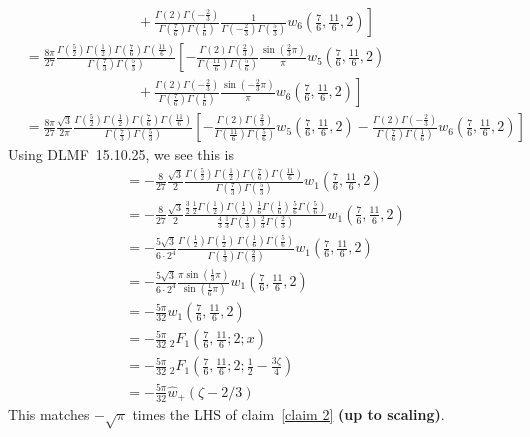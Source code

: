 \documentclass[11pt,a4paper,twoside,leqno,noamsfonts]{amsart}
\numberwithin{equation}{section}
\begin{document}
\begin{example}[Airy]
\begin{align*}
& \qquad\qquad\qquad\qquad + \left. \frac{\Gamma(2) \Gamma(-\tfrac{2}{3})}{\Gamma(\tfrac{7}{6}) \Gamma(\tfrac{1}{6})} \frac{1}{\Gamma(-\tfrac{2}{3}) \Gamma(\tfrac{5}{3})} w_6(\tfrac{7}{6}, \tfrac{11}{6}, 2) \right] \\
&=\frac{8\pi}{27} \frac{\Gamma(\tfrac{5}{2}) \Gamma(\tfrac{1}{2}) \Gamma(\tfrac{7}{6}) \Gamma(\tfrac{11}{6})}{\Gamma(\tfrac{7}{3}) \Gamma(\tfrac{5}{3})} \left[ -\frac{\Gamma(2) \Gamma(\tfrac{2}{3})}{\Gamma(\tfrac{11}{6}) \Gamma(\tfrac{5}{6})} \frac{\sin(\tfrac{2}{3} \pi)}{\pi} w_5(\tfrac{7}{6}, \tfrac{11}{6}, 2) \right. \\
& \qquad\qquad\qquad\qquad + \left. \frac{\Gamma(2) \Gamma(-\tfrac{2}{3})}{\Gamma(\tfrac{7}{6}) \Gamma(\tfrac{1}{6})} \frac{\sin(-\tfrac{2}{3} \pi)}{\pi} w_6(\tfrac{7}{6}, \tfrac{11}{6}, 2) \right] \\
&=\frac{8\pi}{27} \frac{\sqrt{3}}{2\pi} \frac{\Gamma(\tfrac{5}{2}) \Gamma(\tfrac{1}{2}) \Gamma(\tfrac{7}{6}) \Gamma(\tfrac{11}{6})}{\Gamma(\tfrac{7}{3}) \Gamma(\tfrac{5}{3})} \left[ -\frac{\Gamma(2) \Gamma(\tfrac{2}{3})}{\Gamma(\tfrac{11}{6}) \Gamma(\tfrac{5}{6})} w_5(\tfrac{7}{6}, \tfrac{11}{6}, 2) - \frac{\Gamma(2) \Gamma(-\tfrac{2}{3})}{\Gamma(\tfrac{7}{6}) \Gamma(\tfrac{1}{6})} w_6(\tfrac{7}{6}, \tfrac{11}{6}, 2) \right]
\end{align*}
Using DLMF~15.10.25, we see this is
\begin{align*}
&=-\frac{8}{27} \frac{\sqrt{3}}{2} \frac{\Gamma(\tfrac{5}{2}) \Gamma(\tfrac{1}{2}) \Gamma(\tfrac{7}{6}) \Gamma(\tfrac{11}{6})}{\Gamma(\tfrac{7}{3}) \Gamma(\tfrac{5}{3})} w_1(\tfrac{7}{6}, \tfrac{11}{6}, 2) \\
&=-\frac{8}{27} \frac{\sqrt{3}}{2} \frac{\tfrac{3}{2}\,\tfrac{1}{2}\Gamma(\tfrac{1}{2}) \Gamma(\tfrac{1}{2})\,\tfrac{1}{6}\Gamma(\tfrac{1}{6})\,\tfrac{5}{6}\Gamma(\tfrac{5}{6})}{\tfrac{4}{3}\,\tfrac{1}{3}\Gamma(\tfrac{1}{3})\,\tfrac{2}{3}\Gamma(\tfrac{2}{3})} w_1(\tfrac{7}{6}, \tfrac{11}{6}, 2) \\
&=-\frac{5\sqrt{3}}{6 \cdot 2^4} \frac{\Gamma(\tfrac{1}{2}) \Gamma(\tfrac{1}{2})\,\Gamma(\tfrac{1}{6}) \Gamma(\tfrac{5}{6})}{\Gamma(\tfrac{1}{3})\Gamma(\tfrac{2}{3})} w_1(\tfrac{7}{6}, \tfrac{11}{6}, 2) \\
&=-\frac{5\sqrt{3}}{6 \cdot 2^4} \frac{\pi \sin(\tfrac{1}{3}\pi)}{\sin(\tfrac{1}{6}\pi)} w_1(\tfrac{7}{6}, \tfrac{11}{6}, 2) \\
&=-\frac{5\pi}{32} w_1(\tfrac{7}{6}, \tfrac{11}{6}, 2) \\
&=-\frac{5\pi}{32}\,{}_2F_1\left(\frac{7}{6},\frac{11}{6};2;x\right) \\
&=-\frac{5\pi}{32}\,{}_2F_1\left(\frac{7}{6},\frac{11}{6};2;\frac{1}{2}-\frac{3\zeta}{4}\right) \\
&=-\frac{5\pi}{32}\hat{w}_+(\zeta - 2/3)
\end{align*}
This matches $-\sqrt{\pi}$ times the LHS of claim~\eqref{claim 2} \textbf{(up to scaling)}.


\end{example}
\end{document}
